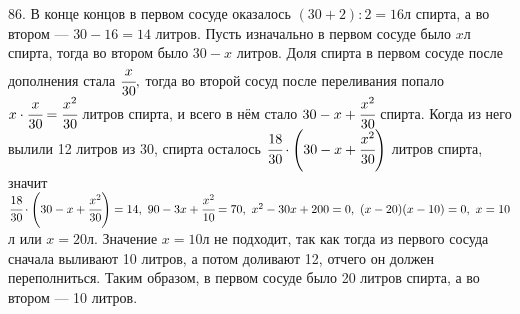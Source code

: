 86. В конце концов в первом сосуде оказалось $(30+2):2=16$л спирта, а во втором --- $30-16=14$ литров. Пусть изначально в первом сосуде было $x$л спирта, тогда во втором было $30-x$ литров. Доля спирта в первом сосуде после дополнения стала $\cfrac{x}{30},$ тогда во второй сосуд после переливания попало $x\cdot\cfrac{x}{30}=\cfrac{x^2}{30}$ литров спирта, и всего в нём стало $30-x+\cfrac{x^2}{30}$ спирта. Когда из него вылили 12 литров из 30,
спирта осталось $\cfrac{18}{30}\cdot\left(30-x+\cfrac{x^2}{30}\right)$ литров спирта, значит $\cfrac{18}{30}\cdot\left(30-x+\cfrac{x^2}{30}\right)=14,\
90-3x+\cfrac{x^2}{10}=70,\ x^2-30x+200=0,\ (x-20)(x-10)=0,\ x=10$л или $x=20$л. Значение $x=10$л не подходит, так как тогда из первого сосуда сначала выливают 10 литров, а потом доливают 12, отчего он должен переполниться. Таким образом, в первом сосуде было 20 литров спирта, а во втором --- 10 литров.\\
